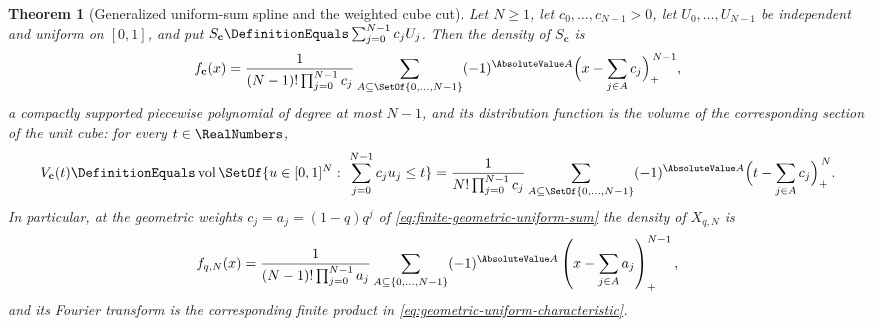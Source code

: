 \documentclass[11pt,a4paper,oneside,openany]{book}
\newtheorem{theorem}{Theorem}[chapter]
\theoremstyle{definition}
\theoremstyle{remark}
\begin{document}
\begin{theorem}[Generalized uniform-sum spline and the weighted cube cut]\label{thm:finite-uniform-spline}
Let $N\ge1$, let $c_0,\ldots,c_{N-1}>0$, let $U_0,\ldots,U_{N-1}$ be independent and
uniform on $[0,1]$, and put $S_{\mathbf c}\DefinitionEquals\sum_{j=0}^{N-1}c_jU_j$.  Then the density
of $S_{\mathbf c}$ is
\begin{equation}\label{eq:general-uniform-spline}
 f_{\mathbf c}(x)
 =\frac1{(N-1)!\prod_{j=0}^{N-1}c_j}
  \sum_{A\subseteq\SetOf{0,\ldots,N-1}}(-1)^{\AbsoluteValue A}
  \Bigl(x-\sum_{j\in A}c_j\Bigr)_+^{\,N-1},
\end{equation}
a compactly supported piecewise polynomial of degree at most $N-1$, and its distribution
function is the volume of the corresponding section of the unit cube: for every
$t\in\RealNumbers$,
\begin{equation}\label{eq:weighted-cube-cut}
 V_{\mathbf c}(t)
 \DefinitionEquals\operatorname{vol}\SetOf{u\in[0,1]^N:\ \sum_{j=0}^{N-1}c_ju_j\le t}
 =\frac1{N!\prod_{j=0}^{N-1}c_j}
  \sum_{A\subseteq\SetOf{0,\ldots,N-1}}(-1)^{\AbsoluteValue A}
  \Bigl(t-\sum_{j\in A}c_j\Bigr)_+^{\,N}.
\end{equation}
In particular, at the geometric weights $c_j=a_j=(1-q)q^j$ of
\eqref{eq:finite-geometric-uniform-sum} the density of $X_{q,N}$ is
\begin{equation}\label{eq:finite-uniform-spline}
 f_{q,N}(x)
 =\frac1{(N-1)!\prod_{j=0}^{N-1}a_j}
 \sum_{A\subseteq\{0,\ldots,N-1\}}
 (-1)^{\AbsoluteValue A}
 \left(x-\sum_{j\in A}a_j\right)_+^{N-1},
\end{equation}
and its Fourier transform is the corresponding finite product in
\eqref{eq:geometric-uniform-characteristic}.
\end{theorem}
\end{document}
